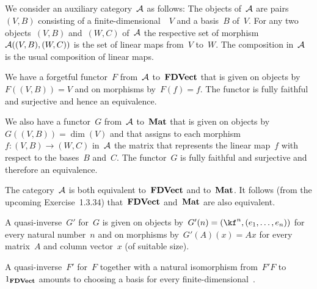 \subsection{}

We consider an auxiliary category~$\mathcal{A}$ as follows:
The objects of~$\mathcal{A}$ are pairs~$(V, B)$ consisting of a finite-dimensional~\vectorspace{$\kf$}~$V$ and a basis~$B$ of~$V$.
For any two objects~$(V, B)$ and~$(W, C)$ of~$\mathcal{A}$ the respective set of morphism~$\mathcal{A}( (V, B), (W, C) )$ is the set of linear maps from~$V$ to~$W$.
The composition in~$\mathcal{A}$ is the usual composition of linear maps.

We have a forgetful functor~$F$ from~$\mathcal{A}$ to~$\mathbf{FDVect}$ that is given on objects by~$F((V, B)) = V$ and on morphisms by~$F(f) = f$.
The functor is fully faithful and surjective and hence an equivalence.

We also have a functor~$G$ from~$\mathcal{A}$ to~$\mathbf{Mat}$ that is given on objects by~$G( (V, B) ) = \dim(V)$ and that assigns to each morphism~$f \colon (V, B) \to (W, C)$ in~$\mathcal{A}$ the matrix that represents the linear map~$f$ with respect to the bases~$B$ and~$C$.
The functor~$G$ is fully faithful and surjective and therefore an equivalence.

The category~$\mathcal{A}$ is both equivalent to~$\mathbf{FDVect}$ and to~$\mathbf{Mat}$.
It follows (from the upcoming Exercise~1.3.34) that~$\mathbf{FDVect}$ and~$\mathbf{Mat}$ are also equivalent.

A quasi-inverse~$G'$ for~$G$ is given on objects by~$G'(n) = (\kf^n, (e_1, \dotsc, e_n))$ for every natural number~$n$ and on morphisms by~$G'(A)(x) = Ax$ for every matrix~$A$ and column vector~$x$ (of suitable size).

A quasi-inverse~$F'$ for~$F$ together with a natural isomorphism from~$F' F$ to~$1_{\mathbf{FDVect}}$ amounts to choosing a basis for every finite-dimensional~\vectorspace{$\kf$}.





